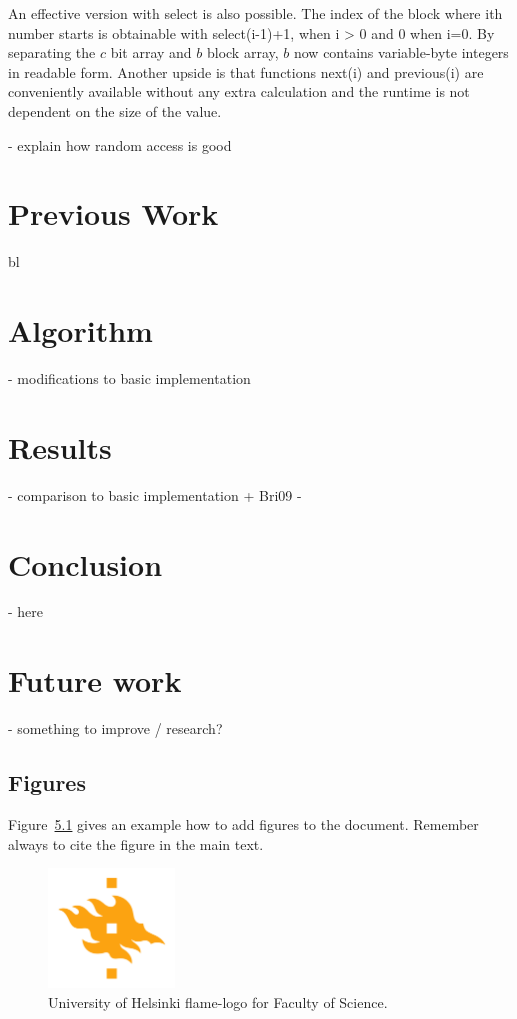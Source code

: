 An effective version with select is also possible. The index of the block where ith number starts is obtainable with select(i-1)+1, when i > 0 and 0 when i=0.
By separating the $c$ bit array and $b$ block array, $b$ now contains variable-byte integers in readable form. Another upside is that functions 
next(i) and previous(i) are conveniently available without any extra calculation and the runtime is not dependent on the size of the value.

- explain how random access is good 

\chapter{Previous Work}
bl

\chapter{Algorithm}
 - modifications to basic implementation
 
\chapter{Results}
 - comparison to basic implementation + Bri09
 - 
\chapter{Conclusion}
 - here

\chapter{Future work}
 - something to improve / research?


\section{Figures}
Figure~\ref{fig:logo} gives an example how to add figures to the document. Remember always to cite the figure in the main text.

\begin{figure}[h!] 
\centering 
\includegraphics[width=0.3\textwidth]{HY-logo-ml.png}
\caption{University of Helsinki flame-logo for Faculty of Science.\label{fig:logo}}
\end{figure}

